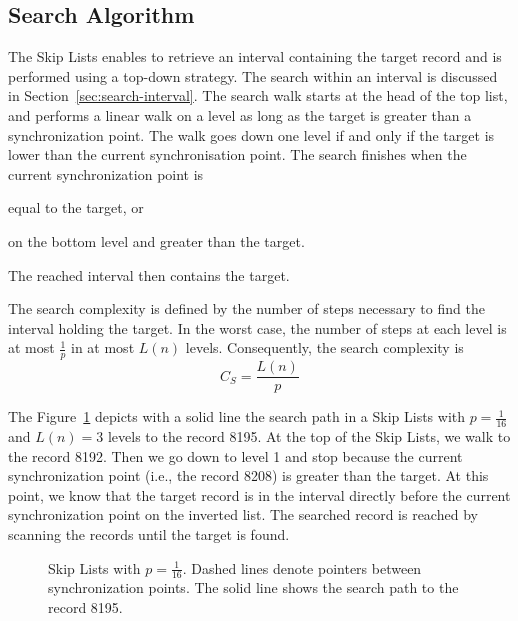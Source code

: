 \subsection{Search Algorithm}
\label{sec:search-skiplists}

The Skip Lists enables to retrieve an interval containing the
target record and is performed using a top-down strategy. The search within an
interval is discussed in Section~\ref{sec:search-interval}. The search walk
starts at the head of the top list, and performs a linear walk on a level as
long as the target is greater than a synchronization point. The walk goes down
one level if and only if the target is lower than the current synchronisation
point. The search finishes when the current synchronization point is
\begin{inparaenum}[(a)]
\item equal to the target, or
\label{target-equal}
\item on the bottom level and greater than the target.
\label{target-lower}
\end{inparaenum}
The reached interval then contains the target.

The search complexity is defined by the number of steps necessary to find the
interval holding the target. In the worst case, the number of steps at each
level is at most $\frac{1}{p}$ in at most $L(n)$ levels. Consequently, the
search complexity is
\begin{equation}
C_S=\frac{L(n)}{p}
\label{eq:skiplists-complexity}
\end{equation}

The Figure~\ref{fig:skiplists} depicts with a solid line the search path in a
Skip Lists with $p = \frac{1}{16}$ and $L(n)=3$ levels to the record 8195. At
the top of the Skip Lists, we walk to the record 8192. Then we go down to level
1 and stop because the current synchronization point (i.e., the record 8208) is
greater than the target. At this point, we know that the target record is in
the interval directly before the current synchronization point on the inverted
list. The searched record is reached by scanning the records until the target
is found.

\begin{figure}
\centering
{}%
\caption{Skip Lists with $p=\frac{1}{16}$. Dashed lines denote pointers between
synchronization points. The solid line shows the search path to the record 8195.}
\label{fig:skiplists}
\end{figure}

